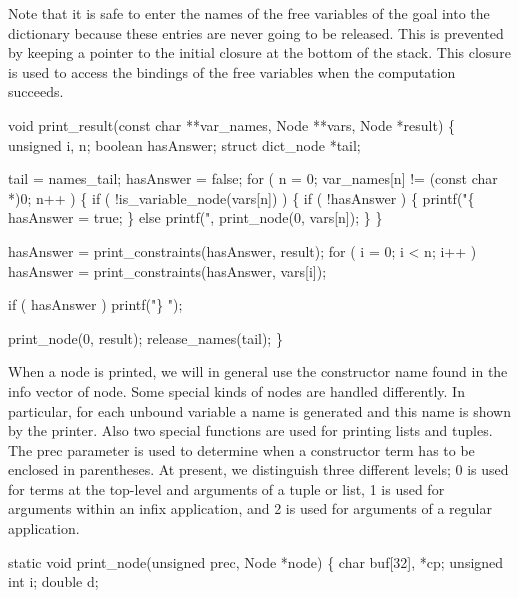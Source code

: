 Note that it is safe to enter the names of the free variables of the
goal into the dictionary because these entries are never going to
be released. This is prevented by keeping a pointer to the initial
closure at the bottom of the stack. This closure is used to access the
bindings of the free variables when the computation succeeds.

\nwenddocs{}\plusendmoddef\nwstartdeflinemarkup{}\nwenddeflinemarkup
void
print_result(const char **var_names, Node **vars, Node *result)
\{
    unsigned         i, n;
    boolean          hasAnswer;
    struct dict_node *tail;

    tail      = names_tail;
    hasAnswer = false;
    for ( n = 0; var_names[n] != (const char *)0; n++ )
    \{
        if ( !is_variable_node(vars[n]) )
        \{
            if ( !hasAnswer )
            \{
                printf("\{%
                hasAnswer = true;
            \}
            else
                printf(", %
            print_node(0, vars[n]);
        \}
    \}

    hasAnswer = print_constraints(hasAnswer, result);
    for ( i = 0; i < n; i++ )
        hasAnswer = print_constraints(hasAnswer, vars[i]);

    if ( hasAnswer )
        printf("\} ");

    print_node(0, result);
    release_names(tail);
\}

\nwendcode{}\nwdocspar
When a node is printed, we will in general use the constructor name
found in the info vector of node. Some special kinds of nodes are
handled differently. In particular, for each unbound variable a name
is generated and this name is shown by the printer. Also two special
functions are used for printing lists and tuples. The {\Tt{}prec\nwendquote}
parameter is used to determine when a constructor term has to be
enclosed in parentheses. At present, we distinguish three different
levels; {\Tt{}0\nwendquote} is used for terms at the top-level and arguments of a
tuple or list, {\Tt{}1\nwendquote} is used for arguments within an infix
application, and {\Tt{}2\nwendquote} is used for arguments of a regular application.

\nwenddocs{}\plusendmoddef\nwstartdeflinemarkup{}\nwenddeflinemarkup
static void
print_node(unsigned prec, Node *node)
\{
    char         buf[32], *cp;
    unsigned int i;
    double       d;

